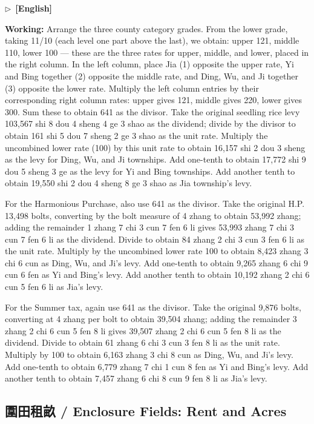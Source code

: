 \documentclass[10pt,a4paper]{article}
\newcommand{\ENmarker}{\noindent\textcolor{enlabel}{$\triangleright$\ \textbf{[English]}}\par}
\newcommand{\WorkingEn}[1]{\par\noindent\textbf{\color{workingcolor}Working:} #1\par}
\begin{document}
\ENmarker
\WorkingEn{Arrange the three county category grades. From the lower grade, taking 11/10 (each level one part above the last), we obtain: upper 121, middle 110, lower 100 --- these are the three rates for upper, middle, and lower, placed in the right column. In the left column, place Jia (1) opposite the upper rate, Yi and Bing together (2) opposite the middle rate, and Ding, Wu, and Ji together (3) opposite the lower rate. Multiply the left column entries by their corresponding right column rates: upper gives 121, middle gives 220, lower gives 300. Sum these to obtain 641 as the divisor. Take the original seedling rice levy 103,567 shi 8 dou 4 sheng 4 ge 3 shao as the dividend; divide by the divisor to obtain 161 shi 5 dou 7 sheng 2 ge 3 shao as the unit rate. Multiply the uncombined lower rate (100) by this unit rate to obtain 16,157 shi 2 dou 3 sheng as the levy for Ding, Wu, and Ji townships. Add one-tenth to obtain 17,772 shi 9 dou 5 sheng 3 ge as the levy for Yi and Bing townships. Add another tenth to obtain 19,550 shi 2 dou 4 sheng 8 ge 3 shao as Jia township's levy.

For the Harmonious Purchase, also use 641 as the divisor. Take the original H.P. 13,498 bolts, converting by the bolt measure of 4 zhang to obtain 53,992 zhang; adding the remainder 1 zhang 7 chi 3 cun 7 fen 6 li gives 53,993 zhang 7 chi 3 cun 7 fen 6 li as the dividend. Divide to obtain 84 zhang 2 chi 3 cun 3 fen 6 li as the unit rate. Multiply by the uncombined lower rate 100 to obtain 8,423 zhang 3 chi 6 cun as Ding, Wu, and Ji's levy. Add one-tenth to obtain 9,265 zhang 6 chi 9 cun 6 fen as Yi and Bing's levy. Add another tenth to obtain 10,192 zhang 2 chi 6 cun 5 fen 6 li as Jia's levy.

For the Summer tax, again use 641 as the divisor. Take the original 9,876 bolts, converting at 4 zhang per bolt to obtain 39,504 zhang; adding the remainder 3 zhang 2 chi 6 cun 5 fen 8 li gives 39,507 zhang 2 chi 6 cun 5 fen 8 li as the dividend. Divide to obtain 61 zhang 6 chi 3 cun 3 fen 8 li as the unit rate. Multiply by 100 to obtain 6,163 zhang 3 chi 8 cun as Ding, Wu, and Ji's levy. Add one-tenth to obtain 6,779 zhang 7 chi 1 cun 8 fen as Yi and Bing's levy. Add another tenth to obtain 7,457 zhang 6 chi 8 cun 9 fen 8 li as Jia's levy.}


\newpage
\subsection*{圍田租畝 / Enclosure Fields: Rent and Acres}
\end{document}
